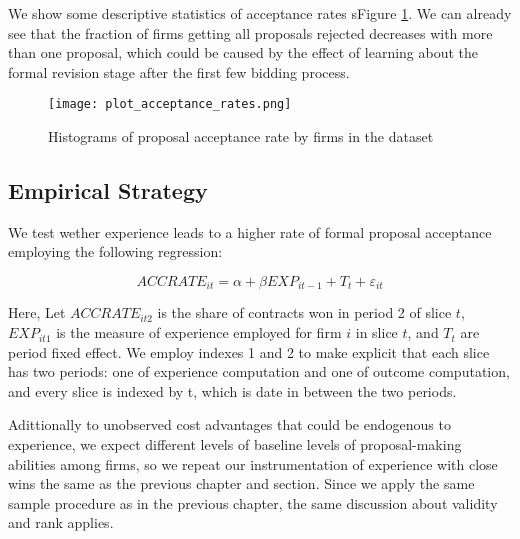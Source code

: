 We show some descriptive statistics of acceptance rates sFigure \ref{fig:plot_acceptance_rates}. We can already see that the fraction of firms getting all proposals rejected decreases with more than one proposal, which could be caused by the effect of learning about the formal revision stage after the first few bidding process.

\begin{figure}
  \texttt{[image: plot\_acceptance\_rates.png]}
  \caption{Histograms of proposal acceptance rate by firms in the dataset}
  \label{fig:plot_acceptance_rates}
\end{figure}

\subsection{Empirical Strategy}
We test wether experience leads to a higher rate of formal proposal acceptance employing the following regression:

\begin{equation}
\label{eqn:olsspec}
ACCRATE_{it}=\alpha+ \beta EXP_{it-1}+T_t+\varepsilon_{it}
\end{equation}

Here, Let $ACCRATE_{it2}$ is the share of contracts won in period 2 of slice $t$, $EXP_{it1} $ is the measure of experience employed for firm $i$ in slice $t$, and $T_t$ are period fixed effect. We employ indexes 1 and 2 to make explicit that each slice has two periods: one of experience computation and one of outcome computation, and every slice is indexed by t, which is date in between the two periods.


Adittionally to unobserved cost advantages that could be endogenous to experience, we expect different levels of baseline levels of proposal-making abilities among firms, so we repeat our instrumentation of experience with close wins the same as the previous chapter and section. Since we apply the same sample procedure as in the previous chapter, the same discussion about validity and rank applies.

